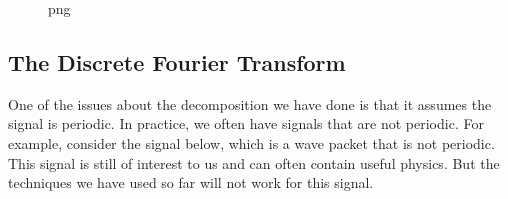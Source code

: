 \begin{figure}
\centering
{}
\caption{png}
\end{figure}

\subsection{The Discrete Fourier
Transform}\label{the-discrete-fourier-transform}

One of the issues about the decomposition we have done is that it
assumes the signal is periodic. In practice, we often have signals that
are not periodic. For example, consider the signal below, which is a
wave packet that is not periodic. This signal is still of interest to us
and can often contain useful physics. But the techniques we have used so
far will not work for this signal.

